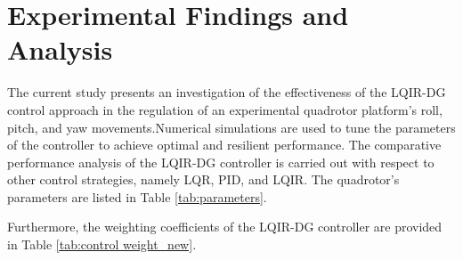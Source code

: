 \documentclass[3p,times]{elsarticle}
\begin{document}
\section{Experimental Findings and Analysis}\label{sec:results}




\noindent The current study presents an investigation of the effectiveness of the LQIR-DG control approach in the regulation of an experimental quadrotor platform's roll, pitch, and yaw movements.Numerical simulations are used to tune the parameters of the controller to achieve optimal and resilient performance. The comparative performance analysis of the LQIR-DG controller is carried out with respect to other control strategies, namely LQR, PID, and LQIR. The quadrotor's parameters are listed in Table \ref{tab:parameters}.

Furthermore, the weighting coefficients of the LQIR-DG controller are provided in Table \ref{tab:control weight_new}.
\end{document}
